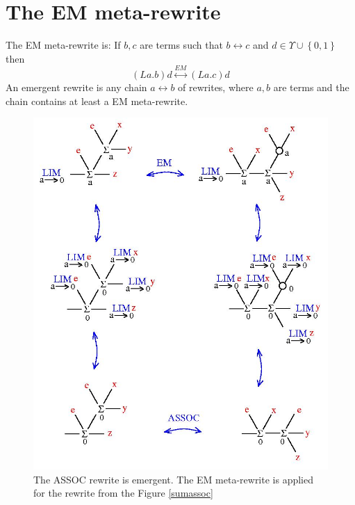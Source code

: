 \section{The EM meta-rewrite}

\begin{definition}
The EM meta-rewrite is: If $b, c$ are terms such that $\displaystyle b \leftrightarrow c$  and $\displaystyle d \in \Upsilon \cup \left\{ 0 , 1 \right\}$ then 
$$\displaystyle (La.b) d \stackrel{EM}{\longleftrightarrow} (La.c) d$$
An emergent rewrite is any chain $a \longleftrightarrow b$ of rewrites, where $a, b$ are terms and the chain contains at least a EM meta-rewrite. 
\end{definition}



\begin{figure}[h]\centerline{\includegraphics[width=120mm]{jpg/sumassoc-em.jpg}}  \caption{ The ASSOC rewrite is emergent. The EM meta-rewrite is applied for the rewrite from the Figure \ref{sumassoc}} \label{sumassoc-em-fig} \end{figure}

